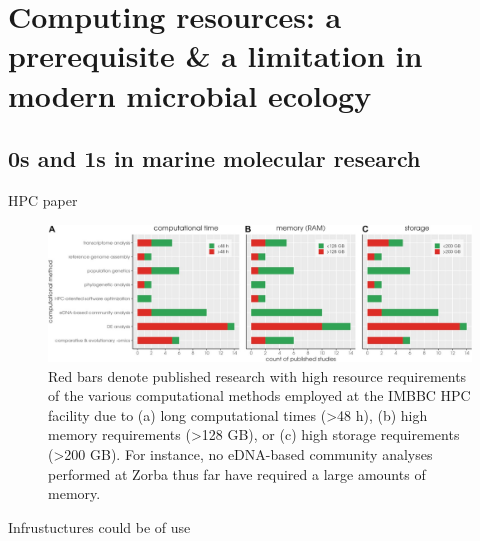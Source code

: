 % 
% 

\chapter{Computing resources: a  prerequisite \& a limitation in modern microbial ecology}
\label{cha:6}


\section{0s and 1s in marine molecular research}

HPC paper

\begin{figure}{}
   \centering
   \includegraphics[width=140mm]{figures/zorbas_jobs_resources.jpeg}
   \caption{Red bars denote published research with high resource requirements of the various computational methods employed at the IMBBC HPC facility due to (a) long computational times (>48 h), (b) high memory requirements (>128 GB), or (c) high storage requirements (>200 GB). For instance, no eDNA-based community analyses performed at Zorba thus far have required a large amounts of memory.}
   \label{fig:zorba_jobs}
\end{figure}



Infrustuctures could be of use

